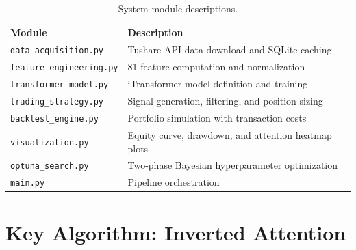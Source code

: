 \documentclass[12pt, a4paper]{article}
\begin{document}
\begin{table}[htbp]
\centering
\caption{System module descriptions.}
\small
\begin{tabular}{ll}
\toprule
\textbf{Module} & \textbf{Description} \\
\midrule
\texttt{data\_acquisition.py}    & Tushare API data download and SQLite caching \\
\texttt{feature\_engineering.py} & 81-feature computation and normalization \\
\texttt{transformer\_model.py}   & iTransformer model definition and training \\
\texttt{trading\_strategy.py}    & Signal generation, filtering, and position sizing \\
\texttt{backtest\_engine.py}     & Portfolio simulation with transaction costs \\
\texttt{visualization.py}       & Equity curve, drawdown, and attention heatmap plots \\
\texttt{optuna\_search.py}      & Two-phase Bayesian hyperparameter optimization \\
\texttt{main.py}                & Pipeline orchestration \\
\bottomrule
\end{tabular}
\end{table}

\section{Key Algorithm: Inverted Attention}
\end{document}
